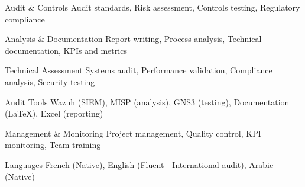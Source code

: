 
\begin{cvskills}

    \cvskill
    {Audit \& Controls} %
    {Audit standards, Risk assessment, Controls testing, Regulatory compliance} %

    \cvskill
    {Analysis \& Documentation} %
    {Report writing, Process analysis, Technical documentation, KPIs and metrics} %

    \cvskill
    {Technical Assessment} %
    {Systems audit, Performance validation, Compliance analysis, Security testing} %

    \cvskill
    {Audit Tools} %
    {Wazuh (SIEM), MISP (analysis), GNS3 (testing), Documentation (LaTeX), Excel (reporting)} %

    \cvskill
    {Management \& Monitoring} %
    {Project management, Quality control, KPI monitoring, Team training} %

    \cvskill
    {Languages} %
    {French (Native), English (Fluent - International audit), Arabic (Native)} %

\end{cvskills}